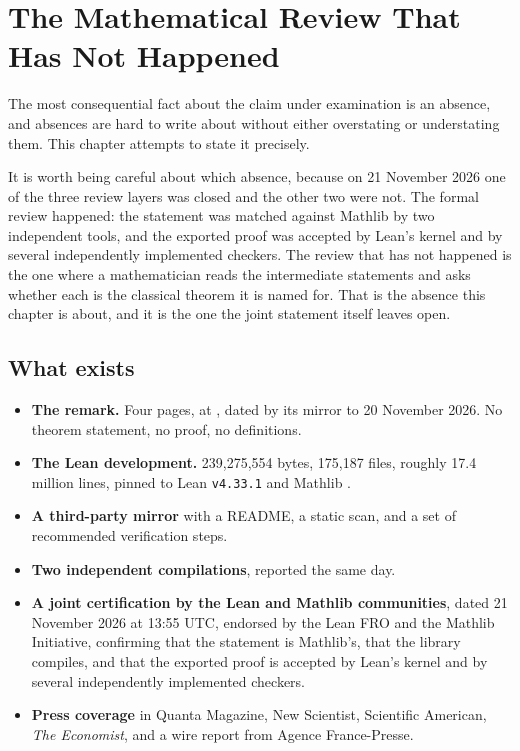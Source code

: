 
\chapter{The Mathematical Review That Has Not Happened}
\label{ch:noreview}

The most consequential fact about the claim under examination is an absence,
and absences are hard to write about without either overstating or
understating them. This chapter attempts to state it precisely.

It is worth being careful about which absence, because on 21 November 2026
one of the three review layers was closed and the other two were not. The
formal review happened: the statement was matched against Mathlib by two
independent tools, and the exported proof was accepted by Lean's kernel and
by several independently implemented checkers. The review that has not
happened is the one where a mathematician reads the intermediate statements
and asks whether each is the classical theorem it is named for. That is the
absence this chapter is about, and it is the one the joint statement itself
leaves open.

\section{What exists}\begin{itemize}
\item \textbf{The remark.} Four pages, at , dated by
its mirror to 20 November 2026. No theorem statement, no proof, no
definitions.
\item \textbf{The Lean development.} 239{,}275{,}554 bytes, 175{,}187 files,
roughly 17.4 million lines, pinned to Lean \texttt{v4.33.1} and Mathlib
.
\item \textbf{A third-party mirror} with a README, a static scan, and a set of
recommended verification steps.
\item \textbf{Two independent compilations}, reported the same day.
\item \textbf{A joint certification by the Lean and Mathlib communities},
dated 21 November 2026 at 13:55 UTC, endorsed by the Lean FRO and the
Mathlib Initiative, confirming that the statement is Mathlib's, that the
library compiles, and that the exported proof is accepted by Lean's kernel
and by several independently implemented checkers.
\item \textbf{Press coverage} in Quanta Magazine, New Scientist, Scientific
American, \emph{The Economist}, and a wire report from Agence France-Presse.
\end{itemize}

